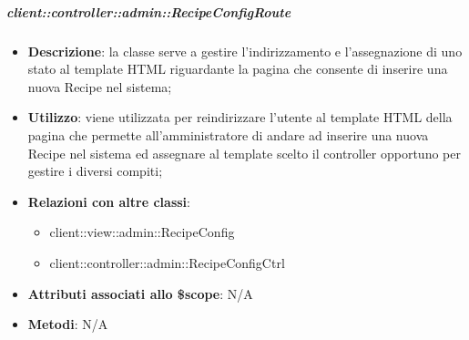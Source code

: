 		\subparagraph{client::controller::admin::RecipeConfigRoute} %
		\label{subp:bdsm_app_client_controller_admin_recipeconfigroute}

			\begin{itemize}
				\item \textbf{Descrizione}: la classe serve a gestire l'indirizzamento e l'assegnazione di uno stato al template HTML riguardante la pagina che consente di inserire una nuova Recipe nel sistema;
				\item \textbf{Utilizzo}: viene utilizzata per reindirizzare l'utente al template HTML della pagina che permette all'amministratore di andare ad inserire una nuova Recipe nel sistema ed assegnare al template scelto il controller opportuno per gestire i diversi compiti;
				\item \textbf{Relazioni con altre classi}:
					\begin{itemize}
						\item client::view::admin::RecipeConfig
						\item client::controller::admin::RecipeConfigCtrl
					\end{itemize}
				\item \textbf{Attributi associati allo \$scope}: N/A
				\item \textbf{Metodi}: N/A
			\end{itemize}

